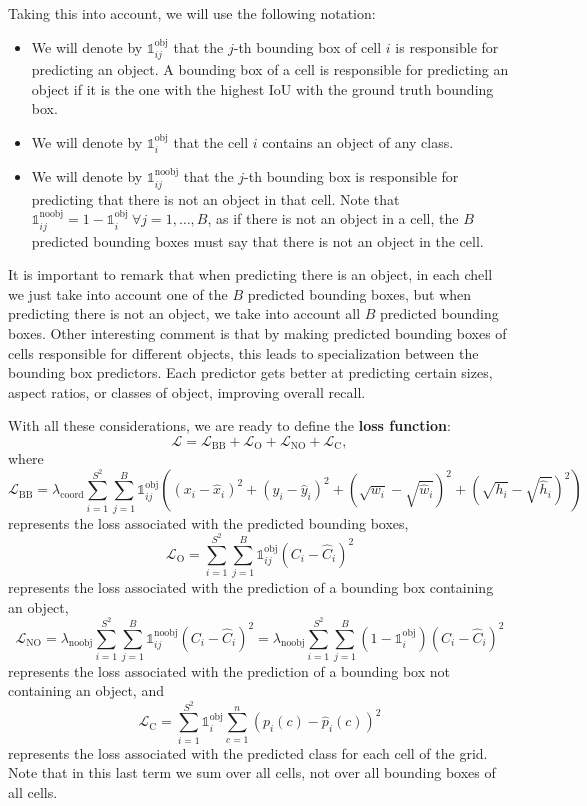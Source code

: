 Taking this into account, we will use the following notation:
\begin{itemize}
\item We will denote by $\mathds{1}_{ij}^\text{obj}$ that the $j$-th bounding box of cell $i$ is responsible for predicting an object. A bounding box of a cell is responsible for predicting an object if it is the one with the highest IoU with the ground truth bounding box.

\item We will denote by $\mathds{1}_i^\text{obj}$ that the cell $i$ contains an object of any class.

\item We will denote by $\mathds{1}_{ij}^\text{noobj}$ that the $j$-th bounding box is responsible for predicting that there is not an object in that cell. Note that $\mathds{1}_{ij}^\text{noobj} = 1 - \mathds{1}_{i}^\text{obj} ~ \forall j=1, \ldots, B$, as if there is not an object in a cell, the $B$ predicted bounding boxes must say that there is not an object in the cell.
\end{itemize}

It is important to remark that when predicting there is an object, in each chell we just take into account one of the $B$ predicted bounding boxes, but when predicting there is not an object, we take into account all $B$ predicted bounding boxes. Other interesting comment is that by making predicted bounding boxes of cells responsible for different objects, this leads to specialization between the bounding box predictors. Each predictor gets better at predicting certain sizes, aspect ratios, or classes of object, improving overall recall.

With all these considerations, we are ready to define the \textbf{loss function}:
$$\mathcal{L} = \mathcal{L}_\text{BB} + \mathcal{L}_\text{O} + \mathcal{L}_\text{NO} + \mathcal{L}_\text{C},$$
where
$$\mathcal{L}_\text{BB}=\lambda_\text{coord}\sum_{i=1}^{S^2}\sum_{j=1}^B \mathds{1}_{ij}^\text{obj}\left(\left(x_i-\hat{x}_i\right)^2 + \left(y_i-\hat{y}_i\right)^2 +\left(\sqrt{w_i}-\sqrt{\hat{w}_i}\right)^2 +\left(\sqrt{h_i}-\sqrt{\hat{h}_i}\right)^2\right)$$
represents the loss associated with the predicted bounding boxes,
$$\mathcal{L}_\text{O}=\sum_{i=1}^{S^2}\sum_{j=1}^B \mathds{1}_{ij}^\text{obj}\left(C_i-\hat{C}_i\right)^2$$
represents the loss associated with the prediction of a bounding box containing an object,
$$\mathcal{L}_\text{NO}=\lambda_\text{noobj}\sum_{i=1}^{S^2}\sum_{j=1}^B \mathds{1}_{ij}^\text{noobj}\left(C_i-\hat{C}_i\right)^2 = \lambda_\text{noobj}\sum_{i=1}^{S^2}\sum_{j=1}^B \left(1-\mathds{1}_{i}^\text{obj}\right)\left(C_i-\hat{C}_i\right)^2$$
represents the loss associated with the prediction of a bounding box not containing an object, and
$$\mathcal{L}_\text{C}=\sum_{i=1}^{S^2}\mathds{1}_i^\text{obj}\sum_{c=1}^n\left(p_i(c)-\hat{p}_i(c)\right)^2$$
represents the loss associated with the predicted class for each cell of the grid. Note that in this last term we sum over all cells, not over all bounding boxes of all cells.

